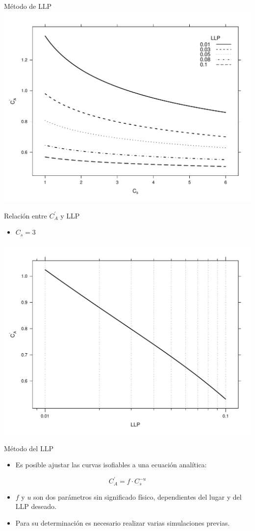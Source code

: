 \documentclass[xcolor={usenames,svgnames,dvipsnames}]{beamer}
\begin{document}
\begin{frame}[label=sec-1-4-3]{Método de LLP}
\includegraphics[width=.9\linewidth]{../figs/CurvasLLP.pdf}
\end{frame}

\begin{frame}[label=sec-1-4-4]{Relación entre $C_{A}^{'}$ y LLP}
\begin{itemize}
\item $C_{s}=3$
\end{itemize}

\includegraphics[width=.9\linewidth]{../figs/CurvasLLP_Cs3.pdf}
\end{frame}

\begin{frame}[label=sec-1-4-5]{Método del LLP}
\begin{itemize}
\item Es posible ajustar las curvas isofiables a una ecuación analítica:
\end{itemize}

\[
C_{A}^{'} = f\cdot C_{s}^{-u}
\]

\begin{itemize}
\item $f$ y $u$ son dos parámetros sin significado físico, dependientes del lugar y del LLP deseado.
\item Para su determinación es necesario realizar varias simulaciones previas.
\end{itemize}
\end{frame}
\end{document}
